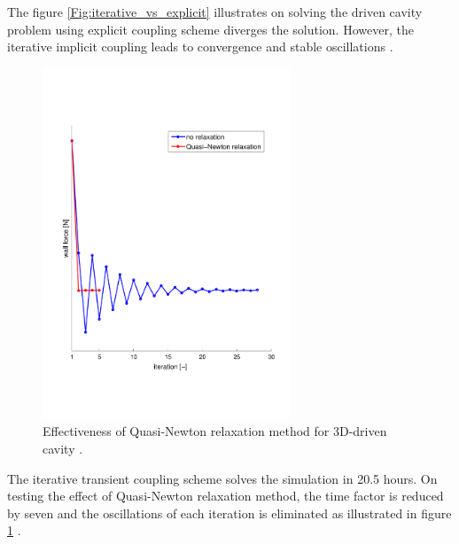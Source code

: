 The figure \ref{Fig:iterative_vs_explicit} illustrates on solving the driven cavity problem using explicit coupling scheme diverges the solution. However, the iterative implicit coupling leads to convergence and stable oscillations \cite{MpCCI_documentation}. 

\begin{figure}[!h]
\centering
\includegraphics[trim={0 3cm 0 3cm},clip,width=0.66\textwidth,height=0.47\textheight]{images/qn_relaxation_drivencavity_1.pdf}
\captionsetup{justification=justified}
\caption[Effectiveness of Quasi-Newton relaxation method for 3D-driven cavity]{Effectiveness of Quasi-Newton relaxation method for 3D-driven cavity \cite{MpCCI_documentation}.}
\label{Fig:qn_relaxation}
\end{figure}

The iterative transient coupling scheme solves the simulation in 20.5 hours. On testing the effect of Quasi-Newton relaxation method, the time factor is reduced by seven and the oscillations of each iteration is eliminated as illustrated in figure \ref{Fig:qn_relaxation} \cite{MpCCI_documentation}.


